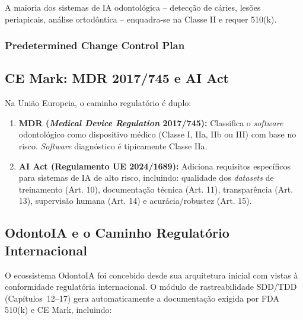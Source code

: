 A maioria dos sistemas de IA odontológica -- detecção de cáries, lesões
periapicais, análise ortodôntica -- enquadra-se na Classe II e requer 510(k).

\subsubsection{Predetermined Change Control Plan}


\subsection{CE Mark: MDR 2017/745 e AI Act}

Na União Europeia, o caminho regulatório é duplo:

\begin{enumerate}
  \item \textbf{MDR (\textit{Medical Device Regulation} 2017/745):} Classifica
    o \textit{software} odontológico como dispositivo médico (Classe I, IIa, IIb
    ou III) com base no risco. \textit{Software} diagnóstico é tipicamente
    Classe IIa.

  \item \textbf{AI Act (Regulamento UE 2024/1689):} Adiciona requisitos
    específicos para sistemas de IA de alto risco, incluindo: qualidade dos
    \textit{datasets} de treinamento (Art. 10), documentação técnica (Art. 11),
    transparência (Art. 13), supervisão humana (Art. 14) e acurácia/robustez
    (Art. 15).
\end{enumerate}

\subsection{OdontoIA e o Caminho Regulatório Internacional}

O ecossistema OdontoIA foi concebido desde sua arquitetura inicial com vistas à
conformidade regulatória internacional. O módulo de rastreabilidade SDD/TDD
(Capítulos~12--17) gera automaticamente a documentação exigida por FDA 510(k) e
CE Mark, incluindo:

